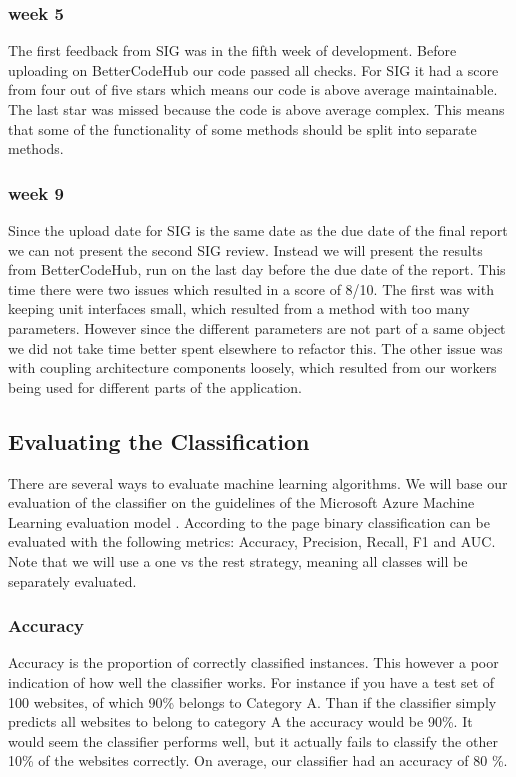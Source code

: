 \subsubsection{week 5}
The first feedback from SIG was in the fifth week of development. Before uploading on BetterCodeHub our code passed all checks. For SIG it had a score from four out of five stars which means our code is above average maintainable. The last star was missed because the code is above average complex. This means that some of the functionality of some methods should be split into separate methods.

\subsubsection{week 9}
Since the upload date for SIG is the same date as the due date of the final report we can not present the second SIG review. Instead we will present the results from BetterCodeHub, run on the last day before the due date of the report. This time there were two issues which resulted in a score of 8/10. The first was with keeping unit interfaces small, which resulted from a method with too many parameters. However since the different parameters are not part of a same object we did not take time better spent elsewhere to refactor this. The other issue was with coupling architecture components loosely, which resulted from our workers being used for different parts of the application.

\subsection{Evaluating the Classification}
There are several ways to evaluate machine learning algorithms. We will base our evaluation of the classifier on the guidelines of the Microsoft Azure Machine Learning evaluation model \cite{EvualteML}. According to the page binary classification can be evaluated with the following metrics: Accuracy, Precision, Recall, F1 and AUC. Note that we will use a one vs the rest strategy, meaning all classes will be separately evaluated.

\subsubsection{Accuracy}\label{sec:mean-accuracy}
Accuracy is the proportion of correctly classified instances. This however a poor indication of how well the classifier works. For instance if you have a test set of 100 websites, of which 90\% belongs to Category A. Than if the classifier simply predicts all websites to belong to category A the accuracy would be 90\%. It would seem the classifier performs well, but it actually fails to classify the other 10\% of the websites correctly. On average, our classifier had an accuracy of 80 \%.

